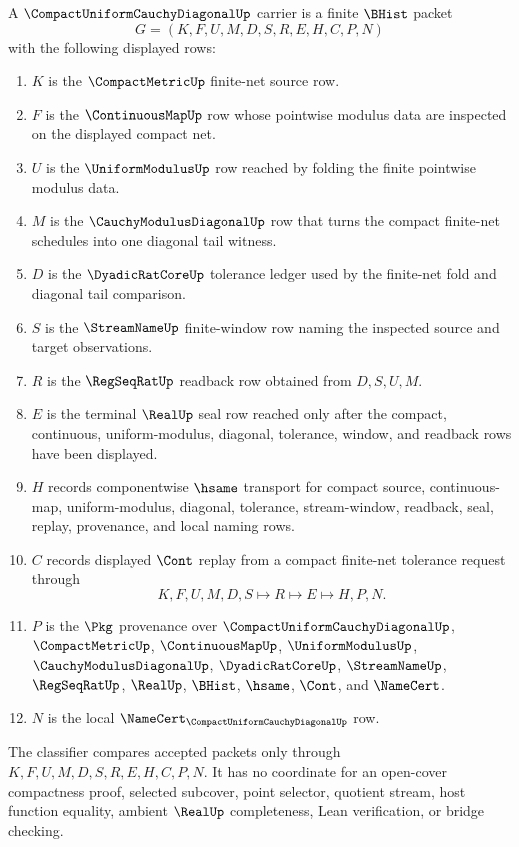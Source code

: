 \begin{definition}
\label{def:compact-uniform-cauchy-diagonal-carrier}
A $\CompactUniformCauchyDiagonalUp$ carrier is a finite $\BHist$ packet
$$
G=(K,F,U,M,D,S,R,E,H,C,P,N)
$$
with the following displayed rows:
\begin{enumerate}
\item $K$ is the $\CompactMetricUp$ finite-net source row.
\item $F$ is the $\ContinuousMapUp$ row whose pointwise modulus data are inspected on the displayed compact net.
\item $U$ is the $\UniformModulusUp$ row reached by folding the finite pointwise modulus data.
\item $M$ is the $\CauchyModulusDiagonalUp$ row that turns the compact finite-net schedules into one diagonal tail witness.
\item $D$ is the $\DyadicRatCoreUp$ tolerance ledger used by the finite-net fold and diagonal tail comparison.
\item $S$ is the $\StreamNameUp$ finite-window row naming the inspected source and target observations.
\item $R$ is the $\RegSeqRatUp$ readback row obtained from $D,S,U,M$.
\item $E$ is the terminal $\RealUp$ seal row reached only after the compact, continuous, uniform-modulus, diagonal, tolerance, window, and readback rows have been displayed.
\item $H$ records componentwise $\hsame$ transport for compact source, continuous-map, uniform-modulus, diagonal, tolerance, stream-window, readback, seal, replay, provenance, and local naming rows.
\item $C$ records displayed $\Cont$ replay from a compact finite-net tolerance request through
$$
K,F,U,M,D,S \longmapsto R \longmapsto E \longmapsto H,P,N .
$$
\item $P$ is the $\Pkg$ provenance over $\CompactUniformCauchyDiagonalUp$, $\CompactMetricUp$, $\ContinuousMapUp$, $\UniformModulusUp$, $\CauchyModulusDiagonalUp$, $\DyadicRatCoreUp$, $\StreamNameUp$, $\RegSeqRatUp$, $\RealUp$, $\BHist$, $\hsame$, $\Cont$, and $\NameCert$.
\item $N$ is the local $\NameCert_{\CompactUniformCauchyDiagonalUp}$ row.
\end{enumerate}
The classifier compares accepted packets only through $K,F,U,M,D,S,R,E,H,C,P,N$. It has no coordinate for an open-cover compactness proof, selected subcover, point selector, quotient stream, host function equality, ambient $\RealUp$ completeness, Lean verification, or bridge checking.
\end{definition}

